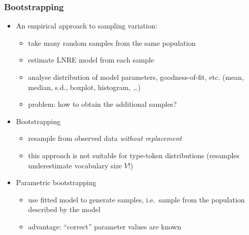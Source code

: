 \documentclass[t]{beamer} %
\begin{document}
\begin{frame}
  \frametitle{Bootstrapping}

  \begin{itemize}
  \item<1-> An empirical approach to sampling variation:
    \begin{itemize}
    \item take many random samples from the same population
    \item estimate LNRE model from each sample
    \item analyse distribution of model parameters, goodness-of-fit, etc.
      (mean, median, s.d., boxplot, histogram, \ldots)
    \item problem: how to obtain the additional samples?
    \end{itemize}
  \item<2-> Bootstrapping \citep{Efron:79}
    \begin{itemize}
    \item resample from observed data \emph{without replacement}
    \item this approach is not suitable for type-token distributions
      (resamples underestimate vocabulary size $V$!)
    \end{itemize}
  \item<3-> Parametric bootstrapping
    \begin{itemize}
    \item use fitted model to generate samples, i.e.\ sample from the population described by the model
    \item advantage: ``correct'' parameter values are known
    \end{itemize}
  \end{itemize}
\end{frame}
\end{document}
